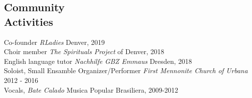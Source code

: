\documentclass[margin, 10pt]{CVStyleTemplate}\usepackage[]{graphicx}\usepackage[]{color}
\begin{document}
\begin{resume}
%








\section{Community \\ Activities} 

Co-founder \emph{RLadies} Denver, 2019 \\
Choir member \emph{The Spirituals Project} of Denver, 2018 \\
English language tutor \emph{Nachhilfe GBZ Emmaus} Dresden, 2018 \\
Soloist, Small Ensamble Organizer/Performer \emph{First Mennonite Church of Urbana} 2012 - 2016\\
Vocals, \emph{Bate Calado} Musica Popular Brasiliera, 2009-2012\\


\end{resume}
\end{document}
